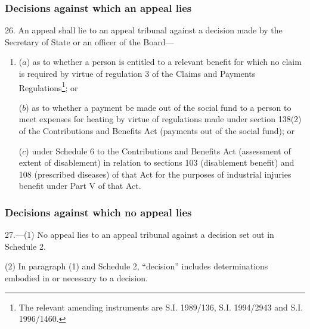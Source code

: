 \documentclass[12pt,a4paper]{article}
\begin{document}
\pagebreak[3]

\subsubsection[26. Decisions against which an appeal lies]{Decisions against which an appeal lies}

26.  An appeal shall lie to an appeal tribunal against a decision made by the Secretary of State
or an officer of the Board—  %
\begin{enumerate}\item[]
($a$) as to whether a person is entitled to a relevant benefit for which no claim is required by virtue of regulation 3 of the Claims and Payments Regulations\footnote{\frenchspacing The relevant amending instruments are S.I. 1989/136, S.I. 1994/2943 and S.I. 1996/1460.}; or

($b$) as to whether a payment be made out of the social fund to a person to meet expenses for heating by virtue of regulations made under section 138(2) of the Contributions and Benefits Act (payments out of the social fund);
or


($c$) under Schedule 6 to the Contributions and Benefits Act (assessment of extent of disablement) in relation to sections 103 (disablement benefit) and 108 (prescribed diseases) of that Act for the purposes of industrial injuries benefit under Part V of that Act.
\end{enumerate}


\subsubsection[27. Decisions against which no appeal lies]{Decisions against which no appeal lies}

27.—(1) No appeal lies to an appeal tribunal against a decision set out in Schedule 2.

(2) In paragraph (1) and Schedule 2, “decision” includes determinations embodied in or necessary to a decision.
\end{document}
